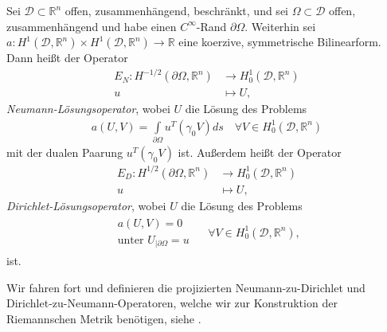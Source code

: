 \begin{defi}[Lösungsoperatoren]\label{Llsgsoperatoren}
Sei $\mathcal{D}\subset\mathbb{R}^n$ offen, zusammenhängend, beschränkt, und sei $\Omega\subset \mathcal{D}$ offen, zusammenhängend und habe einen $C^\infty$-Rand $\partial\Omega$.
Weiterhin sei $a: H^1(\mathcal{D}, \mathbb{R}^n)\times H^1(\mathcal{D}, \mathbb{R}^n) \rightarrow \mathbb{R}$ eine koerzive, symmetrische Bilinearform. Dann heißt der Operator 
\begin{align*}
	E_N: H^{-1/2}(\partial\Omega, \mathbb{R}^n) &\rightarrow H^{1}_0(\mathcal{D}, \mathbb{R}^n) \\
	u &\mapsto U,
\end{align*}
\textit{Neumann-Lösungsoperator}, wobei $U$ die Lösung des Problems
\begin{align*}
	a(U,V) = \underset{\partial\Omega}{\int}u^T(\gamma_0 V)ds \quad \forall V \in H^1_0(\mathcal{D},\mathbb{R}^n)
\end{align*}
mit der dualen Paarung $u^T(\gamma_0 V)$ ist. Außerdem heißt der Operator
\begin{align*}
	E_D: H^{1/2}(\partial\Omega, \mathbb{R}^n) &\rightarrow H^{1}_0(\mathcal{D}, \mathbb{R}^n) \\
	u &\mapsto U,
\end{align*}
\textit{Dirichlet-Lösungsoperator}, wobei $U$ die Lösung des Problems
\begin{align*}
	\begin{matrix} a(U,V) = 0 \\
	\text{unter } U_{\vert \partial\Omega} = u 
	\end{matrix} \quad\; \forall V \in H^1_0(\mathcal{D},\mathbb{R}^n),
\end{align*}
ist.
\end{defi}

Wir fahren fort und definieren die projizierten Neumann-zu-Dirichlet und Dirichlet-zu-Neumann-Operatoren, welche wir zur Konstruktion der Riemannschen Metrik benötigen, siehe \cite{bfgs2}.


